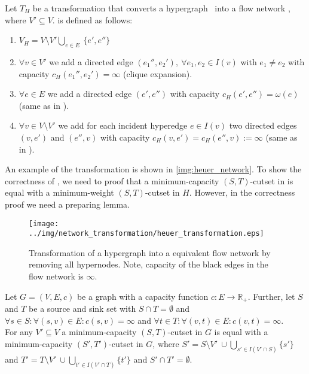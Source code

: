 \begin{definition}
Let $T_H$ be a transformation that converts a hypergraph \HypergraphDef~into 
a flow network , where $V' \subseteq V$.  is defined as follows:
\begin{enumerate}
\item $V_H = V\setminus V' \bigcup\limits_{e \in E}\ \{e', e''\}$
\item $\forall v \in V'$ we add a directed edge $(e_1'', e_2'),\ \forall e_1, e_2 \in I(v)$ 
      with $e_1 \neq e_2$ with capacity $c_H(e_1'', e_2') = \infty$ (clique expansion).
\item $\forall e \in E$ we add a directed edge $(e',e'')$
      with capacity $c_H(e',e'') = \omega(e)$ (same as in ).
\item $\forall v \in V\setminus V'$ we add for each incident hyperedge $e \in I(v)$ two directed
      edges $(v,e')$ and $(e'',v)$ with capacity 
      $c_H(v,e') = c_H(e'',v) := \infty$ (same as in ).
\end{enumerate} 
\end{definition}

An example of the transformation is shown in \autoref{img:heuer_network}. To show
the correctness of , we need to proof that a minimum-capacity $(S,T)$-cutset
in  is equal with a minimum-weight $(S,T)$-cutset in $H$. However,
in the correctness proof we need a preparing lemma.

\begin{figure}
\centering
\texttt{[image: ../img/network\_transformation/heuer\_transformation.eps]}
\caption{Transformation of a hypergraph into a equivalent flow network by removing
         all hypernodes. Note, capacity of the black edges in the flow network is $\infty$.}
\label{img:heuer_network}
\end{figure}

\begin{lemma}
\label{lemma:lemma1}
Let $G = (V,E,c)$ be a graph with a capacity function $c: E \rightarrow \mathbb{R}_+$. Further, 
let $S$ and $T$ be a source and sink set with $S \cap T = \emptyset$ and
$\forall s \in S:\forall (s,v) \in E: c(s,v) = \infty$ and $\forall t 
\in T:\forall (v,t) \in E: c(v,t) = \infty$. \\
For any $V' \subseteq V$ a minimum-capacity $(S,T)$-cutset in $G$ is equal with a minimum-capacity
$(S',T')$-cutset in $G$, where $S' = S\setminus V'\ \cup \bigcup\limits_{s' \in I(V' \cap S)} \{s'\}$ and 
$T' = T\setminus V'\ \cup \bigcup\limits_{t' \in I(V' \cap T)} \{t'\}$ and $S' \cap T' = \emptyset$.
\end{lemma}

